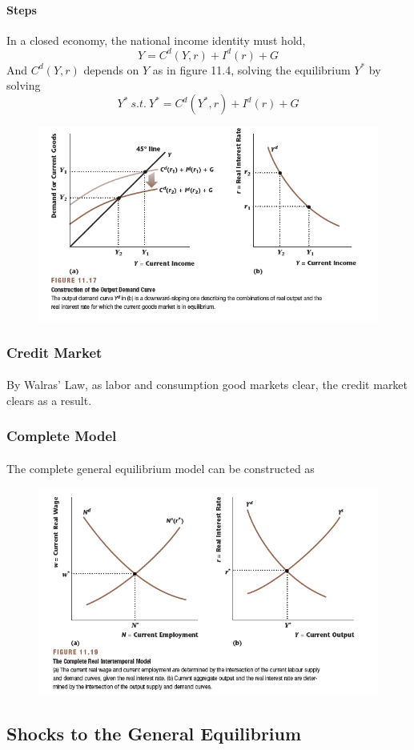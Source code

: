 \documentclass[11pt]{article}
\begin{document}
				\paragraph{Steps} In a closed economy, the national income identity must hold,
					\begin{equation}
						Y = C^d(Y, r) + I^d(r) + G
					\end{equation}
					And $C^d(Y, r)$ depends on $Y$ as in figure 11.4, solving the equilibrium $Y^*$ by solving 
					\begin{equation}
						Y^*\ s.t.\ Y^* = C^d(Y^*,r) + I^d(r) + G
					\end{equation}
					\begin{figure}[h]
						\centering
						\includegraphics[width=\linewidth]{figures/1117}
					\end{figure}
				
				\subsubsection{Credit Market}
					\paragraph{} By Walras' Law, as labor and consumption good markets clear, the credit market clears as a result.
				
				\subsubsection{Complete Model}
					\paragraph{} The complete general equilibrium model can be constructed as
					\begin{figure}
						\centering
						\includegraphics[width=0.7\linewidth]{figures/1119}
					\end{figure}
				
			\subsection{Shocks to the General Equilibrium}
\end{document}

